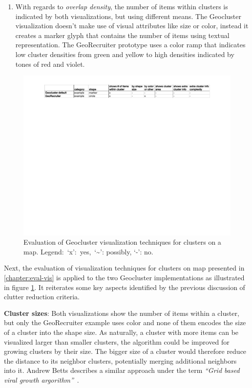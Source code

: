 \begin{enumerate}
\item With regards to \textit{overlap density}, the number of items within clusters is indicated by both visualizations, but using different means. The Geocluster visualization doesn't make use of visual attributes like size or color, instead it creates a marker glyph that contains the number of items using textual representation. The GeoRecruiter prototype uses a color ramp that indicates low cluster densities from green and yellow to high densities indicated by tones of red and violet.

\end{enumerate}

\begin{figure}[h]
  \begin{center}
    \hspace*{-1.5cm}\includegraphics[width=1.2\textwidth]{figures/vis_eval_geocluster.pdf}
    \caption{Evaluation of Geocluster visualization techniques for clusters on a map. Legend:~`x':~yes,~`\textasciitilde': possibly, `-': no.}
    \label{fig:vis-eval-geocluster}
  \end{center}
\end{figure}

Next, the evaluation of visualization techniques for clusters on map presented in \ref{chapter:eval-vis} is applied to the two Geocluster implementations as illustrated in figure \ref{fig:vis-eval-geocluster}. It reiterates some key aspects identified by the previous discussion of clutter reduction criteria.

\textbf{Cluster sizes}: Both visualizations show the number of items within a cluster, but only the GeoRecruiter example uses color and none of them encodes the size of a cluster into the shape size. As naturally, a cluster with more items can be visualized larger than smaller clusters, the algorithm could be improved for growing clusters by their size. The bigger size of a cluster would therefore reduce the distance to its neighbor clusters, potentially merging additional neighbors into it. Andrew Betts describes a similar approach under the term \textit{``Grid based viral growth argorithm''}~\cite{web:clustering-google}.

